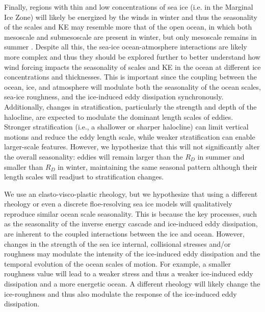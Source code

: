 \documentclass[draft]{agujournal2019}
\begin{document}
Finally, regions with thin and low concentrations of sea ice (i.e. in the Marginal Ice Zone) will likely be energized by the winds in winter and thus the seasonality of the scales and KE may resemble more that of the open ocean, in which both mesoscale and submesoscale are present in winter, but only mesoscale remains in summer \citep{Uchida_seasonal_2017}. 
Despite all this, the sea-ice ocean-atmosphere interactions are likely more complex and thus they should be explored further to better understand how wind forcing impacts the seasonality of scales and KE in the ocean at different ice concentrations and thicknesses. This is important since the coupling between the ocean, ice, and atmosphere will modulate both the seasonality of the ocean scales, sea-ice roughness, and the ice-induced eddy dissipation synchronously.
Additionally, changes in stratification, particularly the strength and depth of the halocline, are expected to modulate the dominant length scales of eddies. Stronger stratification (i.e., a shallower or sharper halocline) can limit vertical motions and reduce the eddy length scale, while weaker stratification can enable larger-scale features. However, we hypothesize that this will not significantly alter the overall seasonality: eddies will remain larger than the $R_D$ in summer and smaller than $R_D$ in winter, maintaining the same seasonal pattern although their length scales will readjust to stratification changes.


We use an elasto-visco-plastic rheology, but we hypothesize that using a different rheology or even a discrete floe-resolving sea ice models will qualitatively reproduce similar ocean scale seasonality. This is because the key processes, such as the seasonality of the inverse energy cascade and ice-induced eddy dissipation, are inherent to the coupled interactions between the ice and ocean. However, changes in the strength of the sea ice internal, collisional stresses and/or roughness may modulate the intensity of the ice-induced eddy dissipation and the temporal evolution of the ocean scales of motion. For example, a smaller roughness value will lead to a weaker stress and thus a weaker ice-induced eddy dissipation and a more energetic ocean. A different rheology will likely change the ice-roughness and thus also modulate the response of the ice-induced eddy dissipation.
\end{document}
